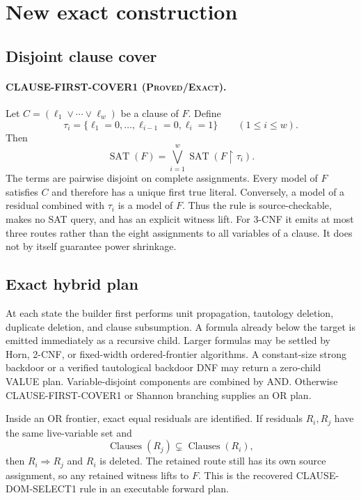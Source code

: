 \documentclass[11pt]{article}
\newcommand{\Exact}{\textnormal{\textsc{Proved/Exact}}}
\begin{document}
\section{New exact construction}

\subsection{Disjoint clause cover}

\paragraph{CLAUSE-FIRST-COVER1 (\Exact).}
Let $C=(\ell_1\vee\cdots\vee\ell_w)$ be a clause of $F$.  Define
\[
 \tau_i=\{\ell_1=0,\ldots,\ell_{i-1}=0,\ell_i=1\}
 \qquad (1\le i\le w).
\]
Then
\[
 \operatorname{SAT}(F)
   =\bigvee_{i=1}^{w}\operatorname{SAT}(F\upharpoonright\tau_i).
\]
The terms are pairwise disjoint on complete assignments.  Every model of $F$
satisfies $C$ and therefore has a unique first true literal.  Conversely, a
model of a residual combined with $\tau_i$ is a model of $F$.  Thus the rule
is source-checkable, makes no SAT query, and has an explicit witness lift.
For 3-CNF it emits at most three routes rather than the eight assignments to
all variables of a clause.  It does not by itself guarantee power shrinkage.

\subsection{Exact hybrid plan}

At each state the builder first performs unit propagation, tautology deletion,
duplicate deletion, and clause subsumption.  A formula already below the
target is emitted immediately as a recursive child.  Larger formulas may be
settled by Horn, 2-CNF, or fixed-width ordered-frontier algorithms.  A
constant-size strong backdoor or a verified tautological backdoor DNF may
return a zero-child VALUE plan.  Variable-disjoint components are combined by
AND.  Otherwise CLAUSE-FIRST-COVER1 or Shannon branching supplies an OR plan.

Inside an OR frontier, exact equal residuals are identified.  If residuals
$R_i,R_j$ have the same live-variable set and
\[
       \operatorname{Clauses}(R_j)
          \subsetneq \operatorname{Clauses}(R_i),
\]
then $R_i\Rightarrow R_j$ and $R_i$ is deleted.  The retained route still has
its own source assignment, so any retained witness lifts to $F$.  This is the
recovered CLAUSE-DOM-SELECT1 rule in an executable forward plan.
\end{document}

